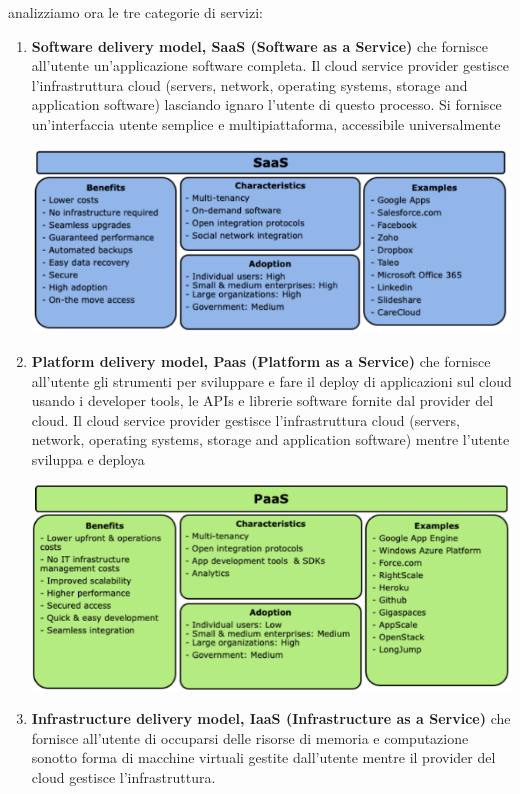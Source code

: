 \documentclass[a4paper,12pt, oneside]{book}
\begin{document}
analizziamo ora le tre categorie di servizi:
\begin{enumerate}
\item \textbf{Software delivery model, SaaS (Software as a Service)} che fornisce all'utente un'applicazione software completa.
  Il cloud service provider gestisce l'infrastruttura cloud (servers, network, operating systems, storage and application software)
  lasciando ignaro l'utente di questo processo. Si fornisce un'interfaccia utente semplice e multipiattaforma, accessibile universalmente
  \begin{center}
  \includegraphics[scale=0.7]{img/saas.png}
  \end{center}
\item \textbf{Platform delivery model, Paas (Platform as a Service)} che fornisce
  all'utente gli strumenti per sviluppare e fare il deploy di applicazioni sul cloud
  usando i developer tools, le APIs e librerie software fornite dal provider del cloud. Il cloud service provider gestisce l'infrastruttura cloud (servers, network, operating systems, storage and application software) mentre l'utente sviluppa e deploya
\begin{center}
\includegraphics[scale=0.7]{img/paas.png}
\end{center}
\item \textbf{Infrastructure delivery model, IaaS (Infrastructure as a Service)}
  che fornisce all'utente di occuparsi delle risorse di memoria e computazione sonotto forma di macchine virtuali gestite dall'utente mentre il provider del cloud gestisce l'infrastruttura.

\end{enumerate}
\end{document}
